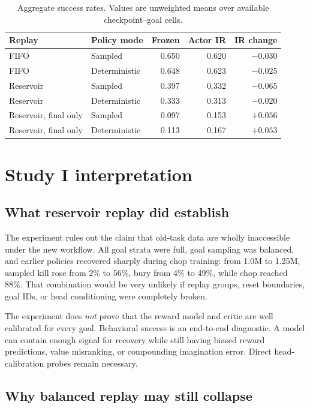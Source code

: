 \documentclass[10pt]{article}
\newcommand{\pct}[1]{#1\%}
\begin{document}
\begin{table}[H]
\centering
\caption{Aggregate success rates. Values are unweighted means over available checkpoint--goal cells.}
\label{tab:aggregate}
\begin{tabular}{llrrr}
\toprule
Replay & Policy mode & Frozen & Actor IR & IR change \\
\midrule
FIFO & Sampled       & 0.650 & 0.620 & $-0.030$ \\
FIFO & Deterministic & 0.648 & 0.623 & $-0.025$ \\
Reservoir & Sampled       & 0.397 & 0.332 & $-0.065$ \\
Reservoir & Deterministic & 0.333 & 0.313 & $-0.020$ \\
\midrule
Reservoir, final only & Sampled       & 0.097 & 0.153 & $+0.056$ \\
Reservoir, final only & Deterministic & 0.113 & 0.167 & $+0.053$ \\
\bottomrule
\end{tabular}
\end{table}

\section{Study I interpretation}

\subsection{What reservoir replay did establish}

The experiment rules out the claim that old-task data are wholly inaccessible under the new workflow. All goal strata were full, goal sampling was balanced, and earlier policies recovered sharply during chop training: from 1.0M to 1.25M, sampled kill rose from \pct{2} to \pct{56}, bury from \pct{4} to \pct{49}, while chop reached \pct{88}. That combination would be very unlikely if replay groups, reset boundaries, goal IDs, or head conditioning were completely broken.

The experiment does \emph{not} prove that the reward model and critic are well calibrated for every goal. Behavioral success is an end-to-end diagnostic. A model can contain enough signal for recovery while still having biased reward predictions, value misranking, or compounding imagination error. Direct head-calibration probes remain necessary.

\subsection{Why balanced replay may still collapse}
\end{document}
